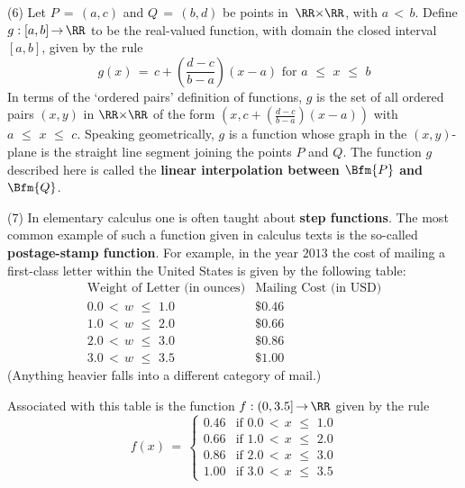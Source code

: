        (6) Let $P \,=\, (a,c)$ and $Q \,=\, (b,d)$ be points in~${\RR}{\times}{\RR}$, with $a\,<\,b$.
    Define $g:[a,b] \,{\rightarrow}\, {\RR}$ to be the real-valued function, with domain the closed interval $[a, b]$, given by the rule
        \begin{displaymath}
        g(x) \,=\, c + \left(\frac{d-c}{b-a}\right)(x-a)
\mbox{ for $a\,\,{\leq}\,\,x\,\,{\leq}\,\,b$}
        \end{displaymath}
    In terms of the `ordered pairs' definition of functions, $g$ is the set of all ordered pairs $(x,y)$ in ${\RR}{\times}{\RR}$ of the form ${\displaystyle \left(x,c + \left(\frac{d-c}{b-a}\right)(x-a)\right)}$ with $a\,\,{\leq}\,\,x\,\,{\leq}\,\,c$.
    Speaking geometrically, $g$ is a function whose graph in the $(x,y)$-plane is the straight line segment joining the points $P$ and $Q$.
    The function $g$ described here is called the {\bf linear interpolation between $\Bfm{P}$ and~$\Bfm{Q}$}.

\V

        (7) In elementary calculus one is often taught about {\bf step functions}.
    The most common example of such a function given in calculus texts is the so-called {\bf postage-stamp function}.
    For example, in the year $2013$ the cost of mailing a first-class letter within the United States is given by the following table:
        \begin{displaymath}
        \begin{array}{ll}
        \mbox{Weight of Letter (in ounces)} & \mbox{Mailing Cost (in USD)} \\
        0.0\,<\,w\,\,{\leq}\,\,1.0 & \mbox{\$0.46}     \\
        1.0\,<\,w\,\,{\leq}\,\,2.0 & \mbox{\$0.66}     \\
        2.0\,<\,w\,\,{\leq}\,\,3.0 & \mbox{\$0.86}     \\
        3.0\,<\,w\,\,{\leq}\,\,3.5 & \mbox{\$1.00}
        \end{array}
        \end{displaymath}
    (Anything heavier falls into a different category of mail.)

        Associated with this table is the function $f:(0,3.5] \,{\rightarrow}\, {\RR}$ given by the rule
        \begin{displaymath}
        f(x) \,=\, \left\{
        \begin{array}{rl}
        0.46 & \mbox{if $0.0\,<\,x\,\,{\leq}\,\,1.0$} \\
        0.66 & \mbox{if $1.0\,<\,x\,\,{\leq}\,\,2.0$} \\
        0.86 & \mbox{if $2.0\,<\,x\,\,{\leq}\,\,3.0$} \\
        1.00 & \mbox{if $3.0\,<\,x\,\,{\leq}\,\,3.5$}
        \end{array}
                        \right.
        \end{displaymath}

